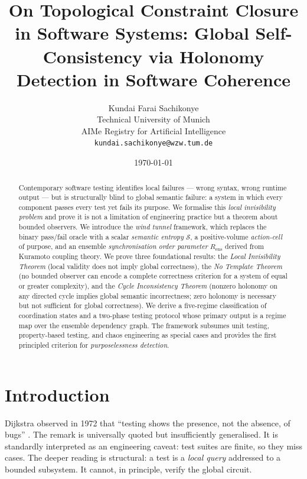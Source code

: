 \documentclass[twocolumn,a4paper,11pt]{article}
\title{\textbf{On Topological Constraint Closure in Software Systems: Global Self-Consistency via Holonomy Detection 
in Software Coherence}}
\author{
Kundai Farai Sachikonye \\
Technical University of Munich \\
AIMe Registry for Artificial Intelligence \\
\texttt{kundai.sachikonye@wzw.tum.de}
}
\date{\today}
\theoremstyle{plain}
\theoremstyle{definition}
\theoremstyle{remark}
\begin{document}
\maketitle

\begin{abstract}
Contemporary software testing identifies local failures --- wrong syntax,
wrong runtime output --- but is structurally blind to global semantic
failure: a system in which every component passes every test yet fails its
purpose. We formalise this \emph{local invisibility problem} and prove it
is not a limitation of engineering practice but a theorem about bounded
observers. We introduce the \emph{wind tunnel} framework, which replaces
the binary pass/fail oracle with a scalar \emph{semantic entropy}
$\mathcal{S}$, a positive-volume \emph{action-cell} of purpose, and an
ensemble \emph{synchronisation order parameter} $R_\mathrm{ens}$ derived
from Kuramoto coupling theory. We prove three foundational results: the
\emph{Local Invisibility Theorem} (local validity does not imply global
correctness), the \emph{No Template Theorem} (no bounded observer can
encode a complete correctness criterion for a system of equal or greater
complexity), and the \emph{Cycle Inconsistency Theorem} (nonzero holonomy
on any directed cycle implies global semantic incorrectness; zero holonomy
is necessary but not sufficient for global correctness).
We derive a five-regime classification of coordination states and a
two-phase testing protocol whose primary output is a regime map over the
ensemble dependency graph. The framework subsumes unit testing,
property-based testing, and chaos engineering as special cases and provides
the first principled criterion for \emph{purposelessness detection}.
\end{abstract}

\section{Introduction}
\label{sec:intro}

Dijkstra observed in 1972 that ``testing shows the presence, not the
absence, of bugs'' \cite{dijkstra1972}. The remark is universally quoted
but insufficiently generalised. It is standardly interpreted as an
engineering caveat: test suites are finite, so they miss cases. The deeper
reading is structural: a test is a \emph{local query} addressed to a
bounded subsystem. It cannot, in principle, verify the global circuit.
\end{document}
